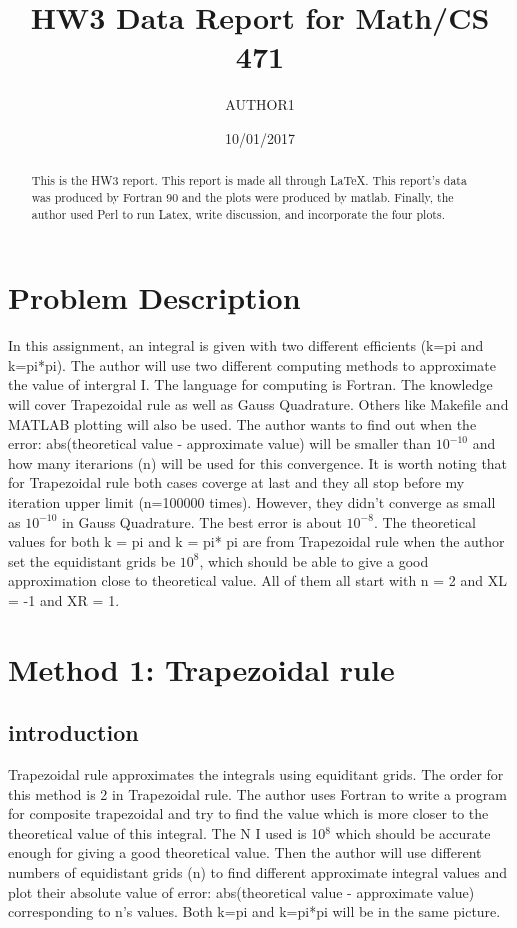 \documentclass[titlepage]{article}
\title{HW3 Data Report for Math/CS 471}
\author{AUTHOR1}
\date{10/01/2017}   %
\begin{document}
\maketitle

\begin{abstract}
This is the HW3 report. This report is made all through LaTeX. This
report's data was produced by Fortran 90 and the plots were produced
by matlab. Finally, the author used Perl to run Latex, write
discussion, and incorporate the four plots.
\end{abstract}

\section{Problem Description}
In this assignment, an integral is given with two different efficients
(k=pi and k=pi*pi). The author will use two different computing methods
to approximate the value of intergral I. The language for computing is
Fortran. The knowledge will cover Trapezoidal rule as well as Gauss
Quadrature. Others like Makefile and MATLAB plotting will also be
used. The author wants to find out when the error: abs(theoretical value -
approximate value) will be smaller than $10^{-10}$ and how many
iterarions (n) will be used for this convergence. It is worth noting
that for Trapezoidal rule both cases coverge at last and they all stop
before my iteration upper limit (n=100000 times). However, they didn't converge
as small as  $10^{-10}$ in Gauss Quadrature. The best error is about
$10^{-8}$. The theoretical values for both k = pi and k = pi* pi are
from Trapezoidal rule when the author set the equidistant grids be
$10^{8}$, which should be able to give a good approximation close to
theoretical value. All of them all start with n = 2 and XL = -1 and XR = 1.

\section{Method 1: Trapezoidal rule}
\subsection{introduction}
Trapezoidal rule approximates the integrals using equiditant
grids. The order for this method is 2 in Trapezoidal rule. The author
uses Fortran to write a program for composite trapezoidal and try to
find the value which is more closer to the theoretical value of this
integral. The N I used is 10$^8$ which should be accurate enough for
giving a good theoretical value. Then the author will use different numbers of
equidistant grids (n) to find different approximate integral values
and plot their absolute value of error: abs(theoretical value -
approximate value) corresponding to n's values. Both k=pi and k=pi*pi
will be in the same picture.
\end{document}
